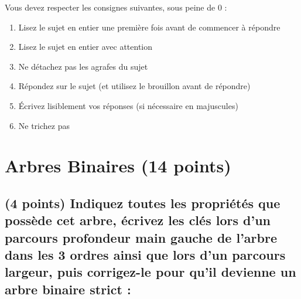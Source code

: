 \documentclass[11pt,a4paper]{article}
\begin{document}
\MakeExamTitle                   %


\bigskip

Vous devez respecter les consignes suivantes, sous peine de 0 :

\begin{enumerate}[label=\Roman*)]
\item Lisez le sujet en entier une première fois avant de commencer à répondre
\item Lisez le sujet en entier avec attention
\item Ne détachez pas les agrafes du sujet
\item Répondez sur le sujet (et utilisez le brouillon avant de répondre)
\item \'Ecrivez lisiblement vos réponses (si nécessaire en majuscules)
\item Ne trichez pas
\end{enumerate}


\vfillFirst

\section{Arbres Binaires (14 points)}

\subsection{(4 points) Indiquez toutes les propriétés que possède cet arbre, écrivez les clés lors d'un parcours profondeur main gauche de l'arbre dans les 3 ordres ainsi que lors d'un parcours largeur, puis corrigez-le pour qu'il devienne un arbre binaire strict : }
\end{document}
